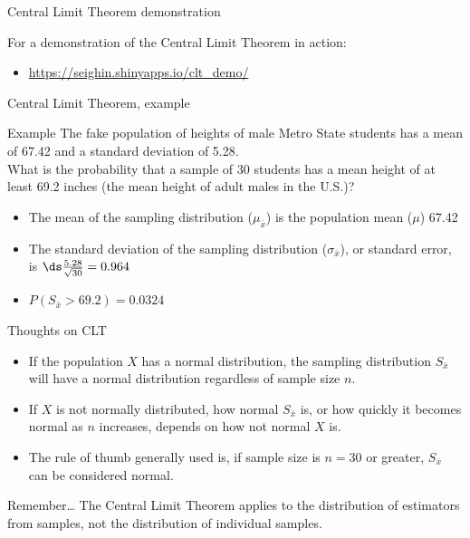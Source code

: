 \documentclass[xcolor=table, aspectratio=169, bigger, handout]{beamer}
\begin{document}
\begin{frame}{Central Limit Theorem demonstration}
\begin{block}{}
For a demonstration of the Central Limit Theorem in action:
\begin{itemize}
\item \url{https://seighin.shinyapps.io/clt_demo/}
\end{itemize}
\end{block}
\end{frame}

\begin{frame}{Central Limit Theorem, example}
\begin{exampleblock}{Example}
The fake population of heights of male Metro State students has a mean of 67.42 and a standard deviation of 5.28. \\
\medskip
What is the probability that a sample of 30 students has a mean height of at least 69.2 inches (the mean height of adult males in the U.S.)?\\ \medskip

\begin{itemize}
\pause\item The mean of the sampling distribution ($\mu_{\bar x}$) is the population mean ($\mu$) 67.42
\pause\item The standard deviation of the sampling distribution ($\sigma_{\bar x}$), or standard error, is $\ds \frac {5.28}{\sqrt{30}} = 0.964$  
\pause\item $P(S_{\bar x} > 69.2) = 0.0324$
\end{itemize}
\end{exampleblock}

\end{frame}

\begin{frame}{Thoughts on CLT}
\begin{block}{}
\begin{itemize}
\item If the population $X$ has a normal distribution, the sampling distribution $S_{\bar x}$ will have a normal distribution regardless of sample size $n$.
\pause\item If $X$ is not normally distributed, how normal $S_{\bar x}$ is, or how quickly it becomes normal as $n$ increases, depends on how not normal $X$ is.
\pause\item The rule of thumb generally used is, if sample size is $n=30$ or greater, $S_{\bar x}$ can be considered normal.
\end{itemize}

\end{block}

\pause
\begin{alertblock}{Remember\ldots}
The Central Limit Theorem applies to the distribution of estimators from samples, not the distribution of individual samples.
\end{alertblock}
\end{frame}
\end{document}
